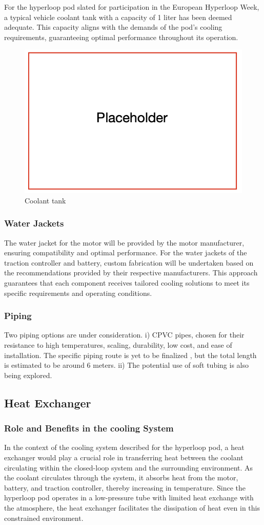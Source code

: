 For the hyperloop pod slated for participation in the European Hyperloop Week, a typical vehicle coolant tank with a capacity of 1 liter has been deemed adequate. This capacity aligns with the demands of the pod's cooling requirements, guaranteeing optimal performance throughout its operation.
\begin{figure}[ht]
  \centering
  \includegraphics[width=0.5\linewidth]{texfiles/mech/eimg/cooling/placeholder}
  \caption{Coolant tank}
  \label{fig:Coolant tank}
\end{figure}

\subsubsection{Water Jackets}
The water jacket for the motor will be provided by the motor manufacturer, ensuring compatibility and optimal performance. For the water jackets of the traction controller and battery, custom fabrication will be undertaken based on the recommendations provided by their respective manufacturers. This approach guarantees that each component receives tailored cooling solutions to meet its specific requirements and operating conditions.

\subsubsection{Piping}
Two piping options are under consideration.
 i) CPVC pipes, chosen for their resistance to high temperatures, scaling, durability, low cost, and ease of installation. The specific piping route is yet to be finalized , but the total length is estimated to be around 6 meters. 
ii) The potential use of soft tubing is also being explored.

\subsection{Heat Exchanger}
\subsubsection{Role and Benefits in the cooling System}
In the context of the cooling system described for the hyperloop pod, a heat exchanger would play a crucial role in transferring heat between the coolant circulating within the closed-loop system and the surrounding environment. As the coolant circulates through the system, it absorbs heat from the motor, battery, and traction controller, thereby increasing in temperature. Since the hyperloop pod operates in a low-pressure tube with limited heat exchange with the atmosphere, the heat exchanger facilitates the dissipation of heat even in this constrained environment.

